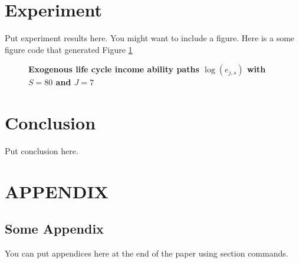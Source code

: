 \documentclass[letterpaper,12pt]{article}
\theoremstyle{definition}
\begin{document}
\begin{spacing}{1.5}{}
\section{Experiment}\label{SecExperiment}

  Put experiment results here. You might want to include a figure. Here is a some figure code that generated Figure \ref{FigLogAbility}

  \begin{figure}[htb]\centering \captionsetup{width=4.0in}
    \caption{\label{FigLogAbility}\textbf{Exogenous life cycle income ability paths $\log(e_{j,s})$ with $S=80$ and $J=7$}}
  \end{figure}


\section{Conclusion}\label{SecConclusion}

  Put conclusion here.

  \clearpage


\end{spacing}


\newpage



\newpage
\renewcommand{\theequation}{A.\arabic{section}.\arabic{equation}}
\renewcommand{\thesection}{A-\arabic{section}}   %
\setcounter{equation}{0}                         %
\setcounter{section}{0}                          %
\section*{APPENDIX}                              %

\begin{spacing}{1.0}

\section{Some Appendix}\label{AppSomeAppendix}

  You can put appendices here at the end of the paper using section commands.




\end{spacing}
\end{document}
